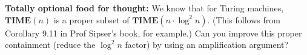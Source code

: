 \documentclass{article}
\newcommand{\TIME}{\mathbf{TIME}}
\begin{document}
	{\bf Totally optional food for thought:} We know that for Turing machines, 
	$\TIME(n)$ is a proper subset of $\TIME(n \cdot \log^2 n)$. (This follows from Corollary 9.11 in Prof Sipser's book, for example.) Can you improve this proper containment (reduce the $\log^2 n$ factor) by using an amplification argument?
		
\end{document}
